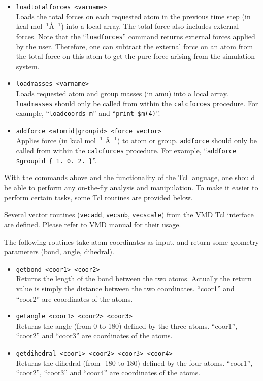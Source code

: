 \begin{itemize}
\item
{\tt loadtotalforces <varname>} \\
Loads the total forces on each requested atom in the previous
time step (in kcal mol$^{-1}$\AA$^{-1}$) into a local array. The
total force also includes external forces. Note that the
``{\tt loadforces}'' command returns external forces applied by
the user. Therefore, one can subtract the external force on an
atom from the total force on this atom to get the pure force
arising from the simulation system.

\item
{\tt loadmasses <varname>} \\
Loads requested atom and group masses (in amu) into a local array.
{\tt loadmasses} should only be called from within the {\tt calcforces} procedure.
For example, ``{\tt loadcoords m}'' and ``{\tt print \$m(4)}''.

\item
{\tt addforce <atomid|groupid> <force vector>} \\
Applies force (in kcal mol$^{-1}$ \AA$^{-1}$) to atom or group.
{\tt addforce} should only be called from within the {\tt calcforces} procedure.
For example, ``\verb!addforce $groupid { 1. 0. 2. }!''.

\end{itemize}

With the commands above and the functionality of the Tcl language,
one should be able to perform any on-the-fly analysis and
manipulation. To make it easier to perform certain tasks,
some Tcl routines are provided below.

Several vector routines ({\tt vecadd}, {\tt vecsub}, {\tt vecscale})
from the VMD Tcl interface are defined. Please refer to VMD
manual for their usage.

The following routines take atom coordinates as input, and return
some geometry parameters (bond, angle, dihedral).

\begin{itemize}

\item
{\tt getbond <coor1> <coor2>} \\
Returns the length of the bond between the two atoms. Actually
the return value is simply the distance between the two
coordinates. ``coor1'' and ``coor2'' are coordinates of the atoms.

\item
{\tt getangle <coor1> <coor2> <coor3>} \\
Returns the angle (from 0 to 180) defined by the
three atoms. ``coor1'', ``coor2'' and ``coor3'' are coordinates of
the atoms.

\item
{\tt getdihedral <coor1> <coor2> <coor3> <coor4>} \\
Returns the dihedral (from -180 to 180) defined by the
four atoms. ``coor1'', ``coor2'', ``coor3'' and ``coor4'' are
coordinates of the atoms.

\end{itemize}


